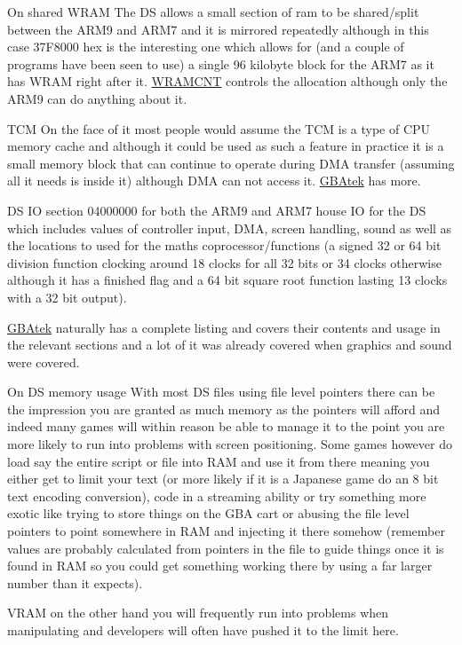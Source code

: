 \documentclass[
]{book}
\begin{document}
On shared WRAM The DS allows a small section of ram to be shared/split between the ARM9 and ARM7 and it is mirrored repeatedly although in this case 37F8000 hex is the interesting one which allows for (and a couple of programs have been seen to use) a single 96 kilobyte block for the ARM7 as it has WRAM right after it. \href{http://problemkaputt.de/gbatek.htm\#dsmemorycontrolwram}{WRAMCNT} controls the allocation although only the ARM9 can do anything about it.

TCM On the face of it most people would assume the TCM is a type of CPU memory cache and although it could be used as such a feature in practice it is a small memory block that can continue to operate during DMA transfer (assuming all it needs is inside it) although DMA can not access it. \href{http://problemkaputt.de/gbatek.htm\#armcp15tightlycoupledmemorytcm}{GBAtek} has more.

DS IO section 04000000 for both the ARM9 and ARM7 house IO for the DS which includes values of controller input, DMA, screen handling, sound as well as the locations to used for the maths coprocessor/functions (a signed 32 or 64 bit division function clocking around 18 clocks for all 32 bits or 34 clocks otherwise although it has a finished flag and a 64 bit square root function lasting 13 clocks with a 32 bit output).

\href{http://problemkaputt.de/gbatek.htm\#dsiomaps}{GBAtek} naturally has a complete listing and covers their contents and usage in the relevant sections and a lot of it was already covered when graphics and sound were covered.

On DS memory usage With most DS files using file level pointers there can be the impression you are granted as much memory as the pointers will afford and indeed many games will within reason be able to manage it to the point you are more likely to run into problems with screen positioning. Some games however do load say the entire script or file into RAM and use it from there meaning you either get to limit your text (or more likely if it is a Japanese game do an 8 bit text encoding conversion), code in a streaming ability or try something more exotic like trying to store things on the GBA cart or abusing the file level pointers to point somewhere in RAM and injecting it there somehow (remember values are probably calculated from pointers in the file to guide things once it is found in RAM so you could get something working there by using a far larger number than it expects).

VRAM on the other hand you will frequently run into problems when manipulating and developers will often have pushed it to the limit here.
\end{document}
